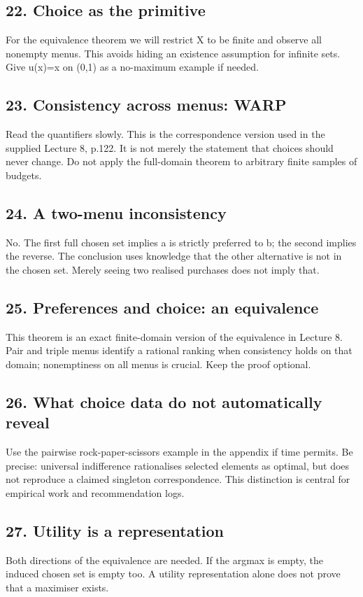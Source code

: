 \documentclass[11pt,a4paper]{article}
\begin{document}
\subsection*{22. Choice as the primitive}
For the equivalence theorem we will restrict X to be finite and observe all nonempty menus. This avoids hiding an existence assumption for infinite sets. Give u(x)=x on (0,1) as a no-maximum example if needed.

\subsection*{23. Consistency across menus: WARP}
Read the quantifiers slowly. This is the correspondence version used in the supplied Lecture 8, p.122. It is not merely the statement that choices should never change. Do not apply the full-domain theorem to arbitrary finite samples of budgets.

\subsection*{24. A two-menu inconsistency}
No. The first full chosen set implies a is strictly preferred to b; the second implies the reverse. The conclusion uses knowledge that the other alternative is not in the chosen set. Merely seeing two realised purchases does not imply that.

\subsection*{25. Preferences and choice: an equivalence}
This theorem is an exact finite-domain version of the equivalence in Lecture 8. Pair and triple menus identify a rational ranking when consistency holds on that domain; nonemptiness on all menus is crucial. Keep the proof optional.

\subsection*{26. What choice data do not automatically reveal}
Use the pairwise rock-paper-scissors example in the appendix if time permits. Be precise: universal indifference rationalises selected elements as optimal, but does not reproduce a claimed singleton correspondence. This distinction is central for empirical work and recommendation logs.

\subsection*{27. Utility is a representation}
Both directions of the equivalence are needed. If the argmax is empty, the induced chosen set is empty too. A utility representation alone does not prove that a maximiser exists.
\end{document}
